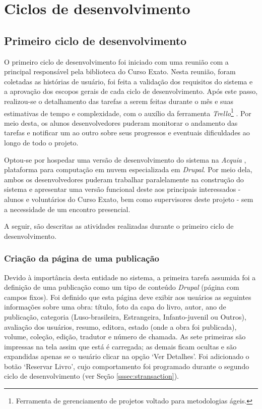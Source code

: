 \documentclass[a4paper]{article}
\begin{document}
\section{Ciclos de desenvolvimento}
\subsection{Primeiro ciclo de desenvolvimento}

O primeiro ciclo de desenvolvimento foi iniciado com uma reunião com a principal responsável pela biblioteca do Curso Exato. Nesta reunião, foram coletadas as histórias de usuário, foi feita a validação dos requisitos do sistema e a aprovação dos escopos gerais de cada ciclo de desenvolvimento. Após este passo, realizou-se o detalhamento das tarefas a serem feitas durante o mês e suas estimativas de tempo e complexidade, com o auxílio da ferramenta \textit{Trello}\footnote{Ferramenta de gerenciamento de projetos voltado para metodologias ágeis.} \cite{trello}. Por meio desta, os alunos desenvolvedores puderam monitorar o andamento das tarefas e notificar um ao outro sobre seus progressos e eventuais dificuldades ao longo de todo o projeto.

Optou-se por hospedar uma versão de desenvolvimento do sistema na \textit{Acquia} \cite{acquia}, plataforma para computação em nuvem especializada em \textit{Drupal}. Por meio dela, ambos os desenvolvedores puderam trabalhar paralelamente na construção do sistema e apresentar uma versão funcional deste aos principais interessados - alunos e voluntários do Curso Exato, bem como supervisores deste projeto - sem a necessidade de um encontro presencial.

A seguir, são descritas as atividades realizadas durante o primeiro ciclo de desenvolvimento.

\subsubsection{Criação da página de uma publicação}

Devido à importância desta entidade no sistema, a primeira tarefa assumida foi a definição de uma publicação como um tipo de conteúdo \textit{Drupal} (página com campos fixos). Foi definido que esta página deve exibir aos usuários as seguintes informações sobre uma obra: título, foto da capa do livro, autor, ano de publicação, categoria (Luso-brasileira, Estrangeira, Infanto-juvenil ou Outros), avaliação dos usuários, resumo, editora, estado (onde a obra foi publicada), volume, coleção, edição, tradutor e número de chamada. As sete primeiras são impressas na tela assim que está é carregada; as demais ficam ocultas e são expandidas apenas se o usuário clicar na opção ‘Ver Detalhes’. Foi adicionado o botão ‘Reservar Livro’, cujo comportamento foi programado durante  o segundo ciclo de desenvolvimento (ver Seção {\ref{sssec:stransaction}}).
\end{document}

